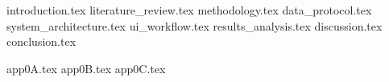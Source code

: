 \documentclass[a4paper,12pt,oneside,openbib,oldfontcommands]{memoir}
\newcommand{\clearemptydoublepage}{\newpage{\thispagestyle{empty}\cleardoublepage}}
\theoremstyle{plain}
\theoremstyle{definition}
\theoremstyle{plain}
\begin{document}
\frontmatter
{}

\hypersetup{pageanchor=false}

\clearemptydoublepage
\hypersetup{pageanchor=true}

\clearemptydoublepage


\clearemptydoublepage


\clearemptydoublepage


\clearemptydoublepage


\clearemptydoublepage

\listoftables
{}
\newpage

\listoffigures
{}
\newpage

\renewcommand{\contentsname}{Table of Contents}
\tableofcontents*

\mainmatter

{introduction.tex}
{literature_review.tex}
{methodology.tex}
{data_protocol.tex}
{system_architecture.tex}
{ui_workflow.tex}
{results_analysis.tex}
{discussion.tex}
{conclusion.tex}

\appendix
{app0A.tex}
{app0B.tex}
{app0C.tex}

\backmatter


\clearemptydoublepage
\end{document}
